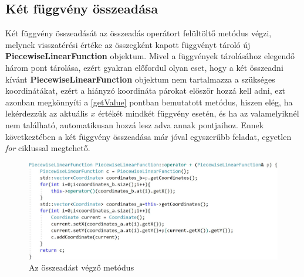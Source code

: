 \subsection{Két függvény összeadása} \label{addPiecewiseLinearFunction}
Két függvény összeadását az összeadás operátort felültöltő metódus végzi, melynek visszatérési értéke az összegként kapott függvényt tároló új \textbf{PiecewiseLinearFunction} objektum. Mivel a függvények tárolásához elegendő három pont tárolása, ezért gyakran előfordul olyan eset, hogy a két összeadni kívánt \textbf{PiecewiseLinearFunction} objektum nem tartalmazza a szükséges koordinátákat, ezért a hiányzó koordináta párokat először hozzá kell adni, ezt azonban megkönnyíti a \ref{getValue} pontban bemutatott metódus, hiszen elég, ha lekérdezzük az aktuális $x$ értékét mindkét függvény esetén, és ha az valamelyiknél nem található, automatikusan hozzá lesz adva annak pontjaihoz. Ennek következtében a két függvény összeadása már jóval egyszerűbb feladat, egyetlen \textit{for} ciklussal megtehető.
\begin{figure}[H]
\begin{center}
\includegraphics[scale=0.365]{add_piecewise}
\caption{Az összeadást végző metódus}
\label{add_piecewise}
\end{center}
\end{figure}

